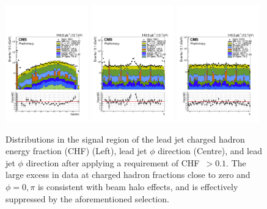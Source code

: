 \begin{figure}[h!]
    \begin{center}
        {\includegraphics[width=0.32\textwidth]{figures/selection/leadJetChf_all_before.pdf}}
        {\includegraphics[width=0.32\textwidth]{figures/selection/leadJetPhi_all_before.pdf}}
        {\includegraphics[width=0.32\textwidth]{figures/selection/leadJetPhi_all_after.pdf}}
        \caption{Distributions in the signal region of the lead jet charged hadron
        energy fraction (CHF) (Left), lead jet $\phi$ direction (Centre), and lead jet $\phi$
        direction after applying a requirement of {CHF~$>0.1$}. The large excess in data
        at charged hadron fractions close to zero and ${\phi = 0, \pi}$ is consistent with beam
        halo effects, and is effectively suppressed by the aforementioned selection.}
        \label{fig:leadJetCleaning}
    \end{center}
\end{figure}

